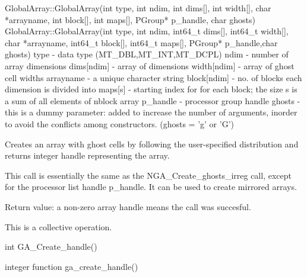 \documentclass[12pt]{article}
\begin{document}
\begin{cxxapi}
GlobalArray::GlobalArray(int type, int ndim, int dims[], int width[],
                         char *arrayname, int block[], int maps[],
                         PGroup* p_handle, char ghosts)
GlobalArray::GlobalArray(int type, int ndim, int64_t dims[], 
                         int64_t width[], char *arrayname, 
                         int64_t block[], int64_t maps[],
                         PGroup* p_handle,char ghosts)
   type          - data type (MT_DBL,MT_INT,MT_DCPL)                      \access{[input]}
   ndim          - number of array dimensions                             \access{[input]}
   dims[ndim]    - array of dimensions                                    \access{[input]}
   width[ndim]   - array of ghost cell widths                             \access{[input]}
   arrayname     - a unique character string                              \access{[input]}
   block[ndim]   - no. of blocks each dimension is divided into           \access{[input]}
   maps[s]       - starting index for for each block;
                   the size s is a sum of all elements of nblock array    \access{[input]}
   p_handle      - processor group handle                                 \access{[input]}
   ghosts        - this is a dummy parameter: added to increase the
                   number of arguments, inorder to avoid the conflicts
                   among constructors. (ghosts = 'g' or 'G')              \access{[input]}
\end{cxxapi}

\begin{desc}

Creates an array with ghost cells by following the user-specified distribution
and returns integer handle representing the array.

This call is essentially the same as the NGA_Create_ghosts_irreg call, except
for the processor list handle p_handle. It can be used to create mirrored arrays.

Return value: a non-zero array handle means the call was succesful.

This is a collective operation.

\end{desc}



\begin{capi}
int GA_Create_handle()
\end{capi}

\begin{fapi}
integer function ga_create_handle()
\end{fapi}
\end{document}
